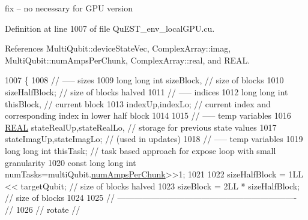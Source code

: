 fix -- no necessary for G\+PU version 

Definition at line 1007 of file Qu\+E\+S\+T\+\_\+env\+\_\+local\+G\+P\+U.\+cu.



References Multi\+Qubit\+::device\+State\+Vec, Complex\+Array\+::imag, Multi\+Qubit\+::num\+Amps\+Per\+Chunk, Complex\+Array\+::real, and R\+E\+AL.


\begin{DoxyCode}
1007                                                                              \{
1008     \textcolor{comment}{// ----- sizes}
1009     \textcolor{keywordtype}{long} \textcolor{keywordtype}{long} \textcolor{keywordtype}{int} sizeBlock,                                           \textcolor{comment}{// size of blocks}
1010          sizeHalfBlock;                                       \textcolor{comment}{// size of blocks halved}
1011     \textcolor{comment}{// ----- indices}
1012     \textcolor{keywordtype}{long} \textcolor{keywordtype}{long} \textcolor{keywordtype}{int} thisBlock,                                           \textcolor{comment}{// current block}
1013          indexUp,indexLo;                                     \textcolor{comment}{// current index and corresponding index in
       lower half block}
1014 
1015     \textcolor{comment}{// ----- temp variables}
1016     \mbox{\hyperlink{QuEST__precision_8h_a4b654506f18b8bfd61ad2a29a7e38c25}{REAL}}   stateRealUp,stateRealLo,                             \textcolor{comment}{// storage for previous state values}
1017            stateImagUp,stateImagLo;                             \textcolor{comment}{// (used in updates)}
1018     \textcolor{comment}{// ----- temp variables}
1019     \textcolor{keywordtype}{long} \textcolor{keywordtype}{long} \textcolor{keywordtype}{int} thisTask;                                   \textcolor{comment}{// task based approach for expose loop with
       small granularity}
1020     \textcolor{keyword}{const} \textcolor{keywordtype}{long} \textcolor{keywordtype}{long} \textcolor{keywordtype}{int} numTasks=multiQubit.\mbox{\hyperlink{structMultiQubit_a1cad83601a78635dd278259c7ed54f18}{numAmpsPerChunk}}>>1;
1021 
1022     sizeHalfBlock = 1LL << targetQubit;                               \textcolor{comment}{// size of blocks halved}
1023     sizeBlock     = 2LL * sizeHalfBlock;                           \textcolor{comment}{// size of blocks}
1024 
1025     \textcolor{comment}{// ---------------------------------------------------------------- //}
1026     \textcolor{comment}{//            rotate                                                //}

\end{DoxyCode}
